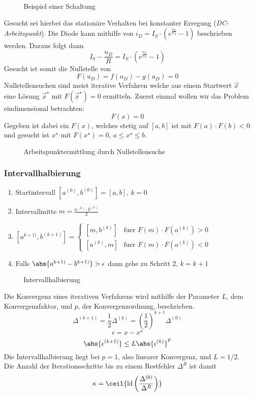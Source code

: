 \begin{figure}[htdp]
	\center
	
	\caption{Beispiel einer Schaltung}
\end{figure}

Gesucht sei hierbei das stationäre Verhalten bei konstanter Erregung (\emph{DC-Arbeitspunkt}). Die Diode kann mithilfe von $i_D = I_S \cdot \left(e^{\frac{u_D}{U_T}} - 1\right)$ beschrieben werden. Daraus folgt dann
\[I_0 - \frac{u_D}{R} = I_S \cdot \left(e^{\frac{u_D}{U_T}} - 1\right)\]
Gesucht ist somit die Nullstelle von
\[F(u_D) = f(u_D) - g(u_D) = 0\]
Nullstellensuchen sind meist iterative Verfahren welche aus einem Startwert $\vec{x}$ eine Lösung $\vec{x}^\star$ mit $F(\vec{x}^\star) = 0$ ermitteln. Zuerst einmal wollen wir das Problem eindimensional betrachten:
\[F(x) = 0\]
Gegeben ist dabei ein $F(x)$, welches stetig auf $[a, b]$ ist mit $F(a) \cdot F(b) < 0$ und gesucht ist $x^\star$ mit $F(x^\star) = 0$, $a \le x^\star \le b$.

\begin{figure}[htdp]
	\center
	
	\caption{Arbeitspunktermittlung durch Nullstellensuche}
\end{figure}

\subsubsection{Intervallhalbierung}
\begin{enumerate}
\item Startintervall $[a^{(0)}, b^{(0)}] = [a, b]$, $k = 0$
\item Intervallmitte $m = \frac{a^{(k)} \cdot b^{(k)}}{2}$
\item $[a^{k + 1)}, b^{(k + 1)}] = \begin{cases} [m, b^{(k)}] & \text{fuer\ } F(m) \cdot F(a^{(k)}) > 0 \\ [a^{(k)}, m] & \text{fuer\ } F(m) \cdot F(a^{(k)}) < 0 \end{cases}$
\item Falls $\abs{a^{k + 1)} - b^{k + 1)}} > \epsilon$ dann gehe zu Schritt 2, $k = k + 1$
\end{enumerate}

\begin{figure}[htdp]
	\center
	
	\caption{Intervallhalbierung}
\end{figure}

Die Konvergenz eines iterativen Verfahrens wird mithilfe der Parameter $L$, dem Konvergenzfaktor, und $p$, der Konvergenzordnung, beschrieben.
\[\Delta^{(k + 1)} = \frac{1}{2} \Delta^{(k)} = (\frac{1}{2})^{k + 1} \Delta^{(0)}\]
\[\epsilon = x - x^\star\]
\[\abs{\epsilon^{(k + 1)}} \le L \abs{\epsilon^{(k)}}^p\]
Die Intervallhalbierung liegt bei $p = 1$, also linearer Konvergenz, und $L = 1/2$. Die Anzahl der Iterationsschritte bis zu einem Restfehler $\Delta^R$ ist damit
\[\kappa = \ceil{\ld \left( \frac{\Delta^{(0)}}{\Delta^R}\right)}\]

